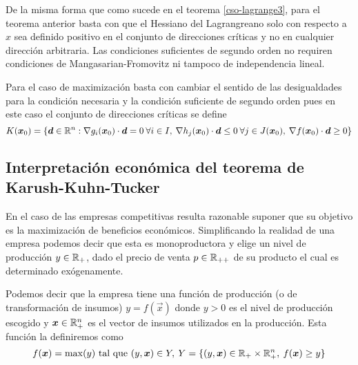 De la misma forma que como sucede en el teorema \ref{cso-lagrange3}, para el teorema anterior basta con que el Hessiano del Lagrangreano solo con respecto a $x$ sea definido positivo en el conjunto de direcciones cr\'iticas y no en cualquier direcci\'on arbitraria. Las condiciones suficientes de segundo orden no requiren condiciones de Mangasarian-Fromovitz ni tampoco de independencia lineal.

Para el caso de maximizaci\'on basta con cambiar el sentido de las desigualdades para la condici\'on necesaria y la condici\'on suficiente de segundo orden pues en este caso el conjunto de direcciones cr\'iticas se define
$$K(\boldsymbol{x}_0)=\{\boldsymbol{d}\in \mathbb{R}^n : \nabla g_i(\boldsymbol{x}_0)\cdot \boldsymbol{d} = 0 \: \forall i\in I,\:\nabla h_j(\boldsymbol{x}_0)\cdot \boldsymbol{d} \leq 0 \: \forall j\in J(\boldsymbol{x}_0) ,\:\nabla f(\boldsymbol{x}_0)\cdot \boldsymbol{d} \geq 0\}$$

\subsection{Interpretaci\'on econ\'omica del teorema de Karush-Kuhn-Tucker}

En el caso de las empresas competitivas resulta razonable suponer que su objetivo es la maximizaci\'on de beneficios econ\'omicos. Simplificando la realidad de una empresa podemos decir que esta es monoproductora y elige un nivel de producci\'on $y\in \mathbb{R}_{+}$, dado el precio de venta $p\in \mathbb{R}_{++}$ de su producto el cual es determinado ex\'ogenamente. 



Podemos decir que la empresa tiene una funci\'on de producci\'on (o de transformaci\'on de insumos) $y=f(\vec{x})$ donde $y>0$ es el nivel de producci\'on escogido y $\boldsymbol{x}\in \mathbb{R}^n_+$ es el vector de insumos utilizados en la producci\'on. Esta funci\'on la definiremos como 
$$f(\boldsymbol{x})=\max(y) \text{ tal que } (y,\boldsymbol{x})\in Y,\:Y=\{(y,\boldsymbol{x})\in\mathbb{R}_+ \times \mathbb{R}^{n}_{+}, \:f(\boldsymbol{x})\geq y\}$$
 
